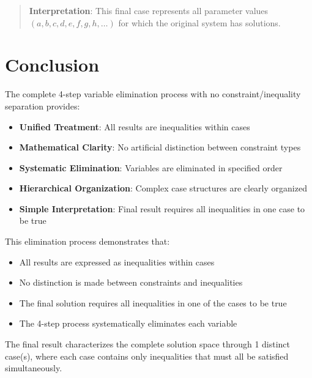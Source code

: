 \documentclass{article}
\newenvironment{stepdetail}
  {\begin{quote}\small\color{blue}}
  {\end{quote}}
\begin{document}
\begin{stepdetail}
\textbf{Interpretation}: This final case represents all parameter values
$(a, b, c, d, e, f, g, h, \ldots)$ for which the original system has solutions.
\end{stepdetail}

\section{Conclusion}

The complete 4-step variable elimination process with no constraint/inequality separation provides:
\begin{itemize}
\item \textbf{Unified Treatment}: All results are inequalities within cases
\item \textbf{Mathematical Clarity}: No artificial distinction between constraint types
\item \textbf{Systematic Elimination}: Variables are eliminated in specified order
\item \textbf{Hierarchical Organization}: Complex case structures are clearly organized
\item \textbf{Simple Interpretation}: Final result requires all inequalities in one case to be true
\end{itemize}

This elimination process demonstrates that:
\begin{itemize}
\item All results are expressed as inequalities within cases
\item No distinction is made between constraints and inequalities
\item The final solution requires all inequalities in one of the cases to be true
\item The 4-step process systematically eliminates each variable
\end{itemize}

The final result characterizes the complete solution space through
1 distinct case(s), where each case contains only inequalities
that must all be satisfied simultaneously.
\end{document}
